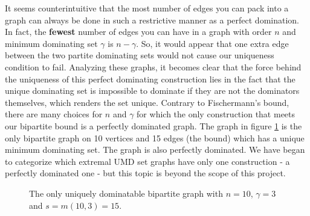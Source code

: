 \documentclass[12pt]{amsart}
\begin{document}
It seems counterintuitive that the most number of edges you can pack into a graph can always be done in such a restrictive manner as a perfect domination. In fact, the \textbf{fewest} number of edges you can have in a graph with order $n$ and minimum dominating set $\gamma$ is $n-\gamma$. So, it would appear that one extra edge between the two partite dominating sets would not cause our uniqueness condition to fail. Analyzing these graphs, it becomes clear that the force behind the uniqueness of this perfect dominating construction lies in the fact that the unique dominating set is impossible to dominate if they are not the dominators themselves, which renders the set unique. Contrary to Fischermann's bound, there are many choices for $n$ and $\gamma$ for which the only construction that meets our bipartite bound is a perfectly dominated graph. The graph in figure \ref{fig:10-3ExGraph} is the only bipartite graph on 10 vertices and 15 edges (the bound) which has a unique minimum dominating set. The graph is also perfectly dominated. We have began to categorize which extremal UMD set graphs have only one construction - a perfectly dominated one - but this topic is beyond the scope of this project.
\begin{figure}[H]
    \centering
    \caption{The only uniquely dominatable bipartite graph with $n=10$, $\gamma = 3$ and $s = m(10,3) = 15$.}
    \label{fig:10-3ExGraph}
\end{figure}
\end{document}
